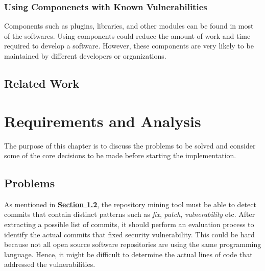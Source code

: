 \documentclass[12pt, a4paper]{report}
\begin{document}
\subsection{Using Componenets with Known Vulnerabilities}
Components such as plugins, libraries, and other modules can be found in most of the softwares.
Using components could reduce the amount of work and time required to develop a software. However,
these components are very likely to be maintained by different developers or organizations.

\section{Related Work}




\chapter{Requirements and Analysis}
The purpose of this chapter is to discuss the problems to be solved and consider some of the core
decisions to be made before starting the implementation.

\section{Problems}
As mentioned in \hyperref[sec:objectives]{\textbf{Section 1.2}}, the repository mining tool must be
able to detect commits that contain distinct patterns such as \textit{fix}, \textit{patch},
\textit{vulnerability} etc. After extracting a possible list of commits, it should perform an
evaluation process to identify the actual commits that fixed security vulnerability.	This could be
hard because not all open source software repositories are using the same programming language.
Hence, it might be difficult to determine the actual lines of code that addressed the
vulnerabilities.
\end{document}
